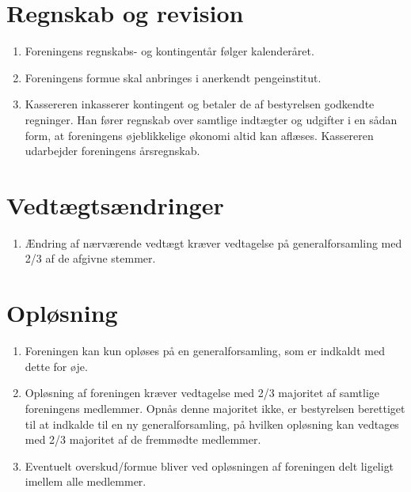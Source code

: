 \documentclass[a4paper, 10pt]{article}
\newenvironment{stykenum}{
  \begin{enumerate}[%
    label=Stk.~\arabic*:, ref=\textsection~\theenumi~Stk.~\arabic*, start=1]
}{\end{enumerate}}
\begin{document}
\section{Regnskab og revision}
\begin{stykenum}
    \item Foreningens regnskabs- og kontingentår følger kalenderåret.

    \item Foreningens formue skal anbringes i anerkendt pengeinstitut.

    \item Kassereren inkasserer kontingent og betaler de af bestyrelsen godkendte
    regninger. Han fører regnskab over samtlige indtægter og udgifter i en sådan
    form, at foreningens øjeblikkelige økonomi altid kan aflæses. Kassereren
    udarbejder foreningens årsregnskab.
\end{stykenum}

\section{Vedtægtsændringer}
\begin{stykenum}
    \item Ændring af nærværende vedtægt kræver vedtagelse på generalforsamling
        med 2/3 af de afgivne stemmer.
\end{stykenum}

\section{Opløsning}
\begin{stykenum}
    \item Foreningen kan kun opløses på en generalforsamling, som er indkaldt
        med dette for øje.

    \item Opløsning af foreningen kræver vedtagelse med 2/3 majoritet af
        samtlige foreningens medlemmer. Opnås denne majoritet ikke, er
        bestyrelsen berettiget til at indkalde til en ny generalforsamling, på
        hvilken opløsning kan vedtages med 2/3 majoritet af de fremmødte
        medlemmer.

    \item Eventuelt overskud/formue bliver ved opløsningen af foreningen delt
        ligeligt imellem alle medlemmer.
\end{stykenum}
\end{document}
